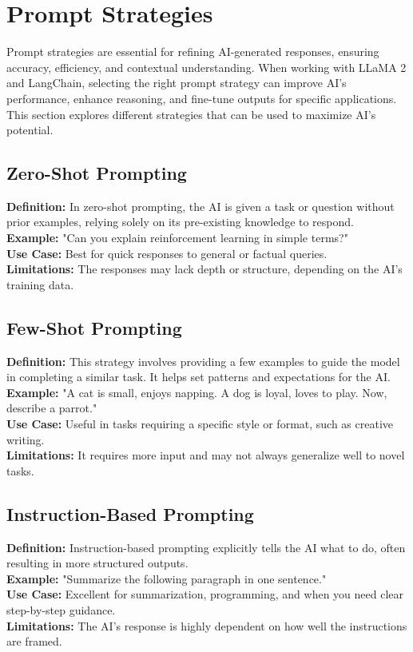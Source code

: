 \section{Prompt Strategies}
Prompt strategies are essential for refining AI-generated responses, ensuring accuracy, efficiency, and contextual understanding. When working with LLaMA 2 and LangChain, selecting the right prompt strategy can improve AI’s performance, enhance reasoning, and fine-tune outputs for specific applications. This section explores different strategies that can be used to maximize AI’s potential.

\subsection{Zero-Shot Prompting}
\textbf{Definition:} In zero-shot prompting, the AI is given a task or question without prior examples, relying solely on its pre-existing knowledge to respond. \\
\textbf{Example:} "Can you explain reinforcement learning in simple terms?" \\
\textbf{Use Case:} Best for quick responses to general or factual queries. \\
\textbf{Limitations:} The responses may lack depth or structure, depending on the AI’s training data. \cite{radford2019language}

\subsection{Few-Shot Prompting}
\textbf{Definition:} This strategy involves providing a few examples to guide the model in completing a similar task. It helps set patterns and expectations for the AI. \\
\textbf{Example:} "A cat is small, enjoys napping. A dog is loyal, loves to play. Now, describe a parrot." \\
\textbf{Use Case:} Useful in tasks requiring a specific style or format, such as creative writing. \\
\textbf{Limitations:} It requires more input and may not always generalize well to novel tasks. \cite{brown2020language}

\subsection{Instruction-Based Prompting}
\textbf{Definition:} Instruction-based prompting explicitly tells the AI what to do, often resulting in more structured outputs. \\
\textbf{Example:} "Summarize the following paragraph in one sentence." \\
\textbf{Use Case:} Excellent for summarization, programming, and when you need clear step-by-step guidance. \\
\textbf{Limitations:} The AI’s response is highly dependent on how well the instructions are framed. \cite{neelakantan2021text}

